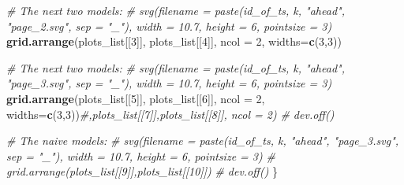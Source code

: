 \documentclass[
]{article}
\newenvironment{Shaded}{\begin{snugshade}}{\end{snugshade}}
\newcommand{\AttributeTok}[1]{\textcolor[rgb]{0.13,0.29,0.53}{#1}}
\newcommand{\CommentTok}[1]{\textcolor[rgb]{0.56,0.35,0.01}{\textit{#1}}}
\newcommand{\DecValTok}[1]{\textcolor[rgb]{0.00,0.00,0.81}{#1}}
\newcommand{\FunctionTok}[1]{\textcolor[rgb]{0.13,0.29,0.53}{\textbf{#1}}}
\newcommand{\NormalTok}[1]{#1}
\begin{document}
\begin{Shaded}
\begin{Highlighting}[]
      \CommentTok{\# The next two models:}
      \CommentTok{\# svg(filename = paste(id\_of\_ts, k, "ahead", "page\_2.svg", sep = "\_"), width = 10.7, height = 6, pointsize = 3)}
      \FunctionTok{grid.arrange}\NormalTok{(plots\_list[[}\DecValTok{3}\NormalTok{]], plots\_list[[}\DecValTok{4}\NormalTok{]], }\AttributeTok{ncol =} \DecValTok{2}\NormalTok{, }\AttributeTok{widths=}\FunctionTok{c}\NormalTok{(}\DecValTok{3}\NormalTok{,}\DecValTok{3}\NormalTok{))}

      \CommentTok{\# The next two models:}
      \CommentTok{\# svg(filename = paste(id\_of\_ts, k, "ahead", "page\_3.svg", sep = "\_"), width = 10.7, height = 6, pointsize = 3)}
      \FunctionTok{grid.arrange}\NormalTok{(plots\_list[[}\DecValTok{5}\NormalTok{]], plots\_list[[}\DecValTok{6}\NormalTok{]], }\AttributeTok{ncol =} \DecValTok{2}\NormalTok{, }\AttributeTok{widths=}\FunctionTok{c}\NormalTok{(}\DecValTok{3}\NormalTok{,}\DecValTok{3}\NormalTok{))}\CommentTok{\#,plots\_list[[7]],plots\_list[[8]], ncol = 2)}
      \CommentTok{\# dev.off()}
      
      \CommentTok{\# The naive models:}
      \CommentTok{\# svg(filename = paste(id\_of\_ts, k, "ahead", "page\_3.svg", sep = "\_"), width = 10.7, height = 6, pointsize = 3)}
      \CommentTok{\# grid.arrange(plots\_list[[9]],plots\_list[[10]])}
      \CommentTok{\# dev.off()}
\NormalTok{    \}}
    

\end{Highlighting}
\end{Shaded}
\end{document}
